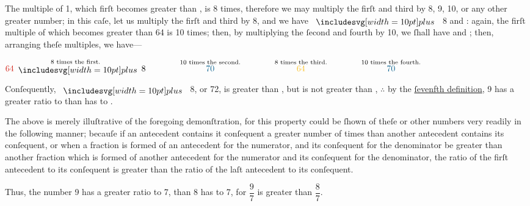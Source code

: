\documentclass[12pt,preview]{standalone}
\begin{document}
\begin{minipage}{\textwidth}
    The multiple of 1, which firſt becomes greater than {\color{cblue}{7}}, is 8 times, therefore we may multiply the firſt and third by 8, 9, 10, or any other greater number; in this caſe, let us multiply the firſt and third by 8, and we have {\color{cred}{64}} $\bplus$ 8 and {\color{cyellow}{64}}: again, the firſt multiple of {\color{cblue}{7}} which becomes greater than 64 is 10 times; then, by multiplying the ſecond and fourth by 10, we ſhall have {\color{cblue}{70}} and {\color{cblue}{70}}; then, arranging theſe multiples, we have---\\

    \hfill

    \begin{center}
        $\overset{\text{8 times the first.}}{{\color{cred}{64}} \bplus 8} \qquad\qquad \overset{\text{10 times the second.}}{{\color{cblue}{70}}} \qquad\qquad \overset{\text{8 times the third.}}{{\color{cyellow}{64}}} \qquad\qquad \overset{\text{10 times the fourth.}}{{\color{cblue}{70}}}$\\
    \end{center}

    Conſequently, {\color{cred}{64}} $\bplus$ 8, or 72, is greater than {\color{cblue}{70}}, but {\color{cyellow}{64}} is not greater than {\color{cblue}{70}}, $\therefore$ by the \hyperref[book5def7]{ſevenfth definition}, 9 has a greater ratio to {\color{cblue}{7}} than {\color{cyellow}{8}} has to {\color{cblue}{7}}.\\

    \hfill

    The above is merely illuſtrative of the foregoing demonſtration, for this property could be ſhown of theſe or other numbers very readily in the following manner; becauſe if an antecedent contains it conſequent a greater number of times than another antecedent contains its conſequent, or when a fraction is formed of an antecedent for the numerator, and its conſequent for the denominator be greater than another fraction which is formed of another antecedent for the numerator and its conſequent for the denominator, the ratio of the firſt antecedent to its conſequent is greater than the ratio of the laſt antecedent to its conſequent.\\

    \hfill

    Thus, the number 9 has a greater ratio to 7, than 8 has to 7, for $\dfrac{\text{9}}{\text{7}}$ is greater than $\dfrac{\text{8}}{\text{7}}$.\\


\end{minipage}
\end{document}
